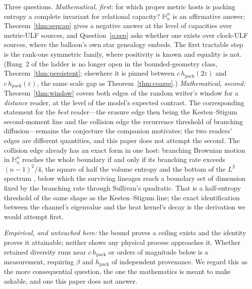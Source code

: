 \documentclass[11pt,reqno]{amsart}
\theoremstyle{plain}
\theoremstyle{definition}
\newcommand{\hpack}{h_{\mathrm{pack}}}
\newcommand{\Hk}{\mathbb{H}^n_\kappa}
\newcommand{\eps}{\varepsilon}
\begin{document}
Three questions. \emph{Mathematical, first:} for which proper metric hosts is packing entropy a complete invariant for relational capacity? $\Hk$ is an affirmative answer; Theorem~\ref{thm:sepcap} gives a negative answer at the level of capacities over metric-ULF sources, and Question~\ref{q:sep} asks whether one exists over clock-ULF sources, where the balloon's own star genealogy embeds. The first tractable step is the rank-one symmetric family, where positivity is known \cite{tessera2008,kerr2022} and equality is not. (Rung~2 of the ladder is no longer open in the bounded-geometry class, Theorem~\ref{thm:persistent}; elsewhere it is pinned between $c\,\hpack(2\eps)$ and $c\,\hpack(\eps)$, the same scale gap as Theorem~\ref{thm:coarse}.) \emph{Mathematical, second:} Theorem~\ref{thm:window} covers both edges of the random writer's window for a \emph{distance} reader, at the level of the model's expected contrast. The corresponding statement for the \emph{best} reader---the erasure edge then being the Kesten--Stigum second-moment line and the collision edge the recurrence threshold of branching diffusion---remains the conjecture the companion motivates; the two readers' edges are different quantities, and this paper does not attempt the second. The collision edge already has an exact form in one host: branching Brownian motion in $\Hk$ reaches the whole boundary if and only if its branching rate exceeds $(n-1)^2/4$, the square of half the volume entropy and the bottom of the $L^2$ spectrum \cite{lalleysellke1997,kps1998}, below which the surviving lineages reach a boundary set of dimension fixed by the branching rate through Sullivan's quadratic. That is a half-entropy threshold of the same shape as the Kesten--Stigum line; the exact identification between the channel's eigenvalue and the heat kernel's decay is the derivation we would attempt first.

\emph{Empirical, and untouched here:} the bound proves a ceiling exists and the identity proves it attainable; neither shows any physical process approaches it. Whether retained diversity runs near $c\,\hpack$ or orders of magnitude below is a measurement, requiring $\beta$ and $\hpack$ of independent provenance. We regard this as the more consequential question, the one the mathematics is meant to make askable, and one this paper does not answer.

\clearpage
\appendix
\end{document}
